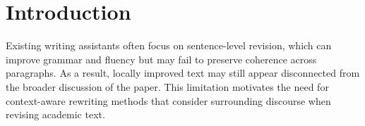 \section{Introduction}

Existing writing assistants often focus on sentence-level revision, which can improve grammar and fluency but may fail to preserve coherence across paragraphs. As a result, locally improved text may still appear disconnected from the broader discussion of the paper. This limitation motivates the need for context-aware rewriting methods that consider surrounding discourse when revising academic text.
